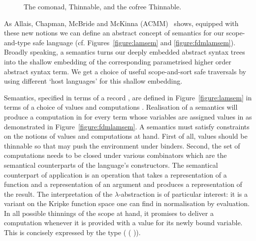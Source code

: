 \begin{figure}[h]
\begin{minipage}{0.45\textwidth}
\end{minipage}\hspace{2em}
\begin{minipage}{0.45\textwidth}
\end{minipage}
\caption{The  comonad, Thinnable, and the cofree Thinnable.}
\end{figure}

As Allais, Chapman, McBride and McKinna (ACMM)~\citeyear{allais2017type} shows,
equipped with these new notions
we can define an abstract concept of semantics for our scope-and-type safe language
(cf. Figures~\ref{figure:lamsem} and \ref{figure:fdmlamsem}).
Broadly speaking, a semantics turns our deeply embedded abstract
syntax trees into the shallow embedding of the corresponding
parametrised higher order abstract syntax term. We get a choice of
useful scope-and-sort safe traversals by using different `host languages'
for this shallow embedding.

Semantics, 
   specified in terms of a record , 
are defined in Figure~\ref{figure:lamsem} in terms of a choice of values  and
computations . Realisation of a semantics will produce a
computation in  for every term whose variables are assigned
values in  as demonstrated in Figure~\ref{figure:fdmlamsem}.
A semantics must satisfy constraints on the notions of
values  and computations  at hand. First of all,
values should be thinnable so that  may push the environment
under binders. Second, the set of computations needs to be closed
under various combinators which are the semantical counterparts of
the language's constructors. The semantical counterpart of application is an operation
that takes a representation of a function and a representation of an
argument and produces a representation of the result.
The interpretation of the $\lambda$-abstraction is of particular interest:
it is a variant on
the Kripke function space one can find in normalisation by evaluation.
In all possible thinnings of the scope at hand, it promises to deliver
a computation whenever it is provided with a value for its newly
bound variable. This is concisely expressed by the type
( ( \AB{$\sigma$}   \AB{$\tau$})).

